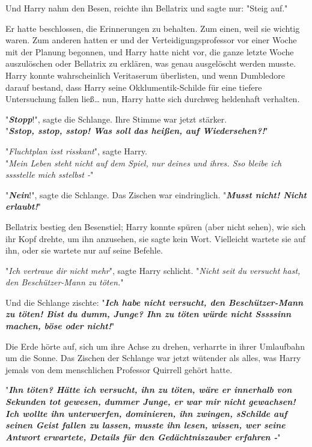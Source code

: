 {Und Harry nahm den Besen, reichte ihn Bellatrix und sagte nur: "Steig auf."

Er hatte beschlossen, die Erinnerungen zu behalten. Zum einen, weil sie wichtig waren. Zum anderen hatten er und der Verteidigungsprofessor vor einer Woche mit der Planung begonnen, und Harry hatte nicht vor, die ganze letzte Woche auszulöschen oder Bellatrix zu erklären, was genau ausgelöscht werden musste.\\ Harry konnte wahrscheinlich Veritaserum überlisten, und wenn Dumbledore darauf bestand, dass Harry seine Okklumentik-Schilde für eine tiefere Untersuchung fallen ließ… nun, Harry hatte sich durchweg heldenhaft verhalten.

"\textbf{\emph{Stopp}}!", sagte die Schlange. Ihre Stimme war jetzt stärker.\\ "\textbf{\emph{Sstop, sstop, sstop! Was soll das heißen, auf Wiedersehen?!}}"

"\emph{Fluchtplan isst risskant}", sagte Harry.\\ "\emph{Mein Leben steht nicht auf dem Spiel, nur deines und ihres. Sso bleibe ich sssstelle mich sstelbst -}"

"\textbf{\emph{Nein}}!", sagte die Schlange. Das Zischen war eindringlich. "\textbf{\emph{Musst nicht! Nicht erlaubt!}}"

Bellatrix bestieg den Besenstiel; Harry konnte spüren (aber nicht sehen), wie sich ihr Kopf drehte, um ihn anzusehen, sie sagte kein Wort. Vielleicht wartete sie auf ihn, oder sie wartete nur auf seine Befehle.

"\emph{Ich vertraue dir nicht mehr}", sagte Harry schlicht. "\emph{Nicht seit du versucht hast, den Beschützer-Mann zu töten.}"

Und die Schlange zischte: "\textbf{\emph{Ich habe nicht versucht, den Beschützer-Mann zu töten! Bist du dumm, Junge? Ihn zu töten würde nicht Sssssinn machen, böse oder nicht!}}"

Die Erde hörte auf, sich um ihre Achse zu drehen, verharrte in ihrer Umlaufbahn um die Sonne. Das Zischen der Schlange war jetzt wütender als alles, was Harry jemals von dem menschlichen Professor Quirrell gehört hatte.

"\textbf{\emph{Ihn töten? Hätte ich versucht, ihn zu töten, wäre er innerhalb von Sekunden tot gewesen, dummer Junge, er war mir nicht gewachsen! Ich wollte ihn unterwerfen, dominieren, ihn zwingen, sSchilde auf seinen Geist fallen zu lassen, musste ihn lesen, wissen, wer seine Antwort erwartete, Details für den Gedächtniszauber erfahren -}}"

}

